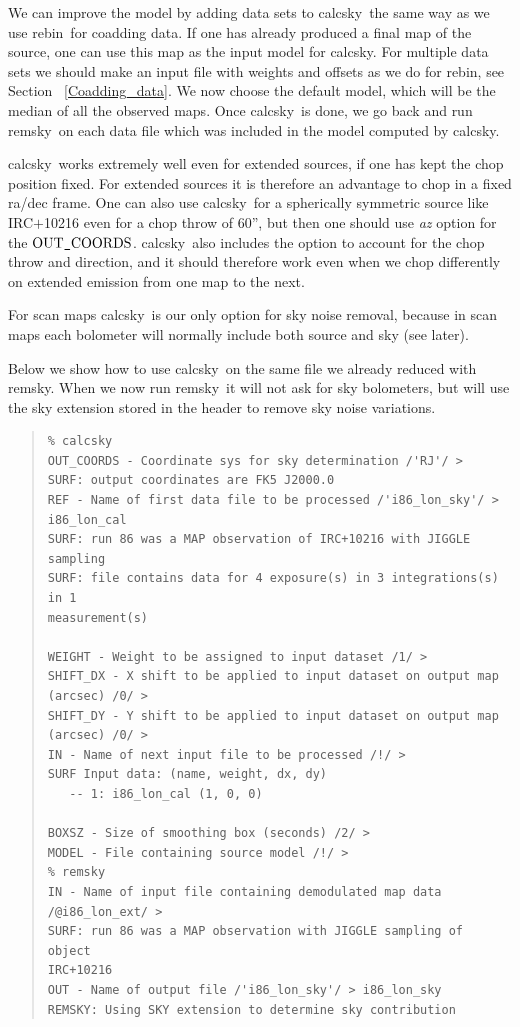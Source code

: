 \documentclass[twoside,11pt]{article}
\newenvironment{myquote}{\begin{quote}\begin{small}}{\end{small}\end{quote}}
\newcommand{\task}[1]{\textsf{#1}}
\newcommand{\rebin}{\xref{\task{rebin}}{sun216}{REBIN}}
\newcommand{\calcsky}{\xref{\task{calcsky}}{sun216}{CALCSKY}}
\newcommand{\remsky}{\xref{\task{remsky}}{sun216}{REMSKY}}
\newcommand{\xref}[3]{#1}
\renewcommand{\_}{\texttt{\symbol{95}}}
\begin{document}
We can improve the model by adding data sets to \calcsky\ the same way
as we use \rebin\ for coadding data.  If one has already produced a
final map of the source, one can use this map as the input model for
\calcsky.  For multiple data sets we should make an input file with
weights and offsets as we do for \rebin, see Section \
\ref{Coadding_data}. We now choose the default model, which will be
the median of all the observed maps.  Once \calcsky\ is done, we go
back and run \remsky\ on each data file which was included in the model
computed by \calcsky.

\calcsky\ works extremely well even for extended sources, if one has
kept the chop position fixed. For extended sources it is therefore an
advantage to chop in a fixed ra/dec frame. One can also use \calcsky\
for a spherically symmetric source like IRC$+$10216 even for a chop
throw of 60'', but then one should use {\it az} option for the $\rm
OUT\_COORDS$.  \calcsky\ also includes the option to account for the
chop throw and direction, and it should therefore work even when we
chop differently on extended emission from one map to the next.



For scan maps \calcsky\ is our only option for sky noise removal,
because in scan maps each bolometer will normally include both source
and sky (see later).

Below we show how to use \calcsky\ on the same file we already reduced
with \remsky. When we now run \remsky\ it will not ask for sky
bolometers, but will use the sky extension stored in the header to
remove sky noise variations.


\begin{myquote}
\begin{verbatim}
% calcsky
OUT_COORDS - Coordinate sys for sky determination /'RJ'/ > 
SURF: output coordinates are FK5 J2000.0
REF - Name of first data file to be processed /'i86_lon_sky'/ > 
i86_lon_cal
SURF: run 86 was a MAP observation of IRC+10216 with JIGGLE sampling
SURF: file contains data for 4 exposure(s) in 3 integrations(s) in 1
measurement(s)

WEIGHT - Weight to be assigned to input dataset /1/ > 
SHIFT_DX - X shift to be applied to input dataset on output map 
(arcsec) /0/ > 
SHIFT_DY - Y shift to be applied to input dataset on output map 
(arcsec) /0/ > 
IN - Name of next input file to be processed /!/ > 
SURF Input data: (name, weight, dx, dy)
   -- 1: i86_lon_cal (1, 0, 0)

BOXSZ - Size of smoothing box (seconds) /2/ > 
MODEL - File containing source model /!/ > 
% remsky
IN - Name of input file containing demodulated map data 
/@i86_lon_ext/ > 
SURF: run 86 was a MAP observation with JIGGLE sampling of object 
IRC+10216
OUT - Name of output file /'i86_lon_sky'/ > i86_lon_sky
REMSKY: Using SKY extension to determine sky contribution
\end{verbatim}
\end{myquote}
\end{document}
